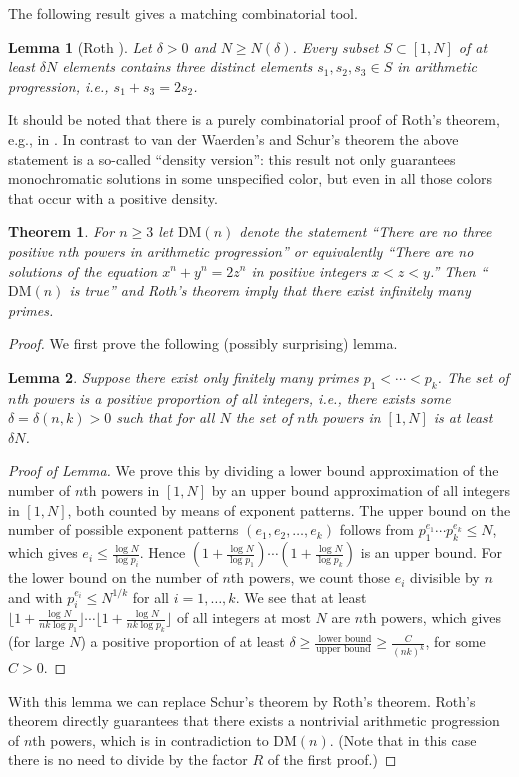 \documentclass{article}
\theoremstyle{theorem}
\newtheorem{theorem}{Theorem}
\newtheorem{lemma}{Lemma}
\theoremstyle{definition}
\newcommand{\DM}{\mathrm{DM}}
\begin{document}
The following result gives a matching combinatorial tool.
\begin{lemma}[Roth \cite{Roth}]
Let $\delta>0$ and $N\geq N(\delta)$.
 Every subset $ S\subset[1,N]$ of at least $\delta N$ elements contains
three distinct elements $s_1,s_2,s_3\in S$ in arithmetic progression, 
i.e., $s_1+s_3=2s_2$.
\end{lemma}
It should be noted that there is a purely combinatorial proof of Roth's theorem,
e.g., in \cite[pp. 46--49]{Graham-Rothschild-Spencer}. 
In contrast to van der Waerden's and
Schur's theorem the above statement
is a so-called ``density version'': this result not only guarantees
monochromatic solutions in some unspecified color, but even in all those 
colors that occur with a positive density.
\begin{theorem}
For $n \geq 3$ let $\DM(n)$ denote the statement
``There are no three positive $n$th powers in arithmetic progression''
or equivalently 
``There are no solutions of the equation 
$x^n+y^n=2z^n$ in positive integers $x<z<y$.''
Then ``$\DM(n)$ is true'' and Roth's theorem imply that
there exist infinitely many primes.
\end{theorem}

\begin{proof}
We first prove the following (possibly surprising) lemma.
\begin{lemma}{\label{positive-density}}
 Suppose there exist only finitely many primes $p_1< \cdots < p_k$.
The set of $n$th powers is a positive proportion of all
integers, i.e., there exists some $\delta=\delta(n,k) >0$ such that for all $N$
the set of $n$th powers in $[1,N]$ is at least $\delta N$.
\end{lemma}
\begin{proof}[Proof of Lemma]
We prove this by
dividing a lower bound approximation of the number of $n$th powers in $[1,N]$
by an upper
bound approximation of all integers in $[1,N]$, both counted by means of
exponent patterns.
The upper bound
on the number of possible exponent patterns $(e_1, e_2, \ldots ,e_k)$ follows
from $p_1^{e_1} \cdots p_k^{e_k}\leq N$, which gives $e_i \leq \frac{\log
  N}{\log p_i}$. Hence 
$(1+\frac{\log N}{\log p_1}) \cdots (1+\frac{\log N}{\log p_k})$ 
is an upper bound.
For the lower bound on the number of $n$th powers, we 
count those $e_i$ divisible by $n$ and with 
$p_i^{e_i}\leq N^{1/k}$ for all $i=1, \ldots ,k$. We see that
at least $\lfloor 1+ \frac{\log N}{nk\log p_1}\rfloor 
\cdots \lfloor 1+\frac{\log N}{nk\log p_k}\rfloor $ of all integers at most $N$
are $n$th powers, 
which gives (for large $N$) a positive proportion of at least
$\delta\geq \frac{\textrm{ lower bound}}{\textrm{upper bound}}\geq
\frac{C}{(nk)^k}$, for some $C>0$.
\end{proof}
With this lemma we can replace Schur's theorem by Roth's theorem.
Roth's theorem directly guarantees 
that there exists a nontrivial arithmetic progression of $n$th
powers, 
which is in contradiction to $\DM(n)$. 
(Note that in this case there is no need to divide by 
the factor $R$ of the first proof.)
\end{proof}
\end{document}
